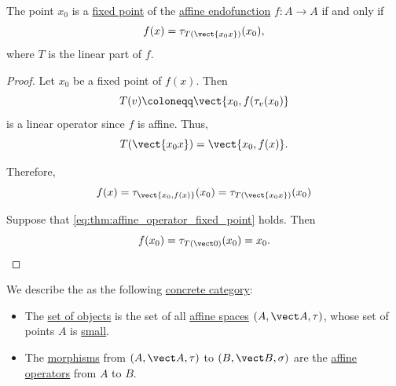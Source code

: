 \begin{proposition}\label{thm:affine_operator_fixed_point}
  The point \( x_0 \) is a \hyperref[def:function_fixed_point]{fixed point} of the \hyperref[def:affine_operator]{affine endofunction} \( f: A \to A \) if and only if
  \begin{equation}\label{eq:thm:affine_operator_fixed_point}
    f(x) = \tau_{T(\vect{x_0 x})}(x_0),
  \end{equation}
  where \( T \) is the linear part of \( f \).
\end{proposition}
\begin{proof}
  \SufficiencySubProof Let \( x_0 \) be a fixed point of \( f(x) \). Then
  \begin{equation*}
    T(v) \coloneqq \vect{x_0,f(\tau_v(x_0)}
  \end{equation*}
  is a linear operator since \( f \) is affine. Thus,
  \begin{equation*}
    T(\vect{x_0 x}) = \vect{x_0,f(x)}.
  \end{equation*}

  Therefore,
  \begin{equation*}
    f(x) = \tau_{\vect{x_0,f(x)}}(x_0) = \tau_{T(\vect{x_0 x})}(x_0)
  \end{equation*}

  \NecessitySubProof Suppose that \eqref{eq:thm:affine_operator_fixed_point} holds. Then
  \begin{equation*}
    f(x_0) = \tau_{T(\vect 0)}(x_0) = x_0.
  \end{equation*}
\end{proof}

\begin{definition}\label{def:category_of_small_affine_spaces}
  We describe the  as the following \hyperref[def:concrete_category]{concrete category}:

  \begin{itemize}
    \item The \hyperref[def:category/objects]{set of objects} is the set of all \hyperref[def:affine_space]{affine spaces} \( (A, \vect A, \tau) \), whose set of points \( A \) is \hyperref[def:small_set]{small}.

    \item The \hyperref[def:category/morphisms]{morphisms} from \( (A, \vect A, \tau) \) to \( (B, \vect B, \sigma) \) are the \hyperref[def:affine_operator]{affine operators} from \( A \) to \( B \).
  \end{itemize}
\end{definition}

